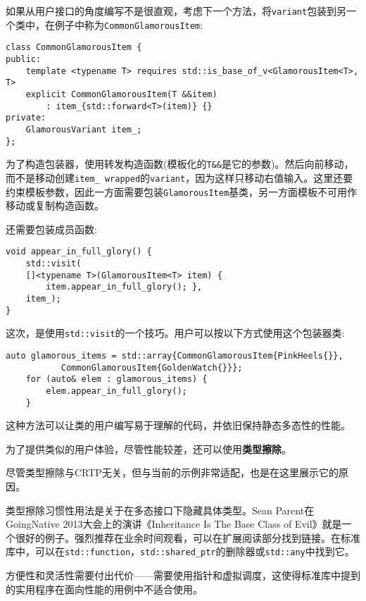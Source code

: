 如果从用户接口的角度编写不是很直观，考虑下一个方法，将\texttt{variant}包装到另一个类中，在例子中称为\texttt{CommonGlamorousItem}:

\begin{lstlisting}[style=styleCXX]
class CommonGlamorousItem {
public:
	template <typename T> requires std::is_base_of_v<GlamorousItem<T>, T>
	explicit CommonGlamorousItem(T &&item)
		: item_{std::forward<T>(item)} {}
private:
	GlamorousVariant item_;
};
\end{lstlisting}

为了构造包装器，使用转发构造函数(模板化的\texttt{T\&\&}是它的参数)。然后向前移动，而不是移动创建\texttt{item\_ wrapped}的\texttt{variant}，因为这样只移动右值输入。这里还要约束模板参数，因此一方面需要包装\texttt{GlamorousItem}基类，另一方面模板不可用作移动或复制构造函数。

还需要包装成员函数:

\begin{lstlisting}[style=styleCXX]
void appear_in_full_glory() {
	std::visit(
	[]<typename T>(GlamorousItem<T> item) {
		item.appear_in_full_glory(); },
	item_);
}
\end{lstlisting}

这次，是使用\texttt{std::visit}的一个技巧。用户可以按以下方式使用这个包装器类:

\begin{lstlisting}[style=styleCXX]
auto glamorous_items = std::array{CommonGlamorousItem{PinkHeels{}},
		   CommonGlamorousItem{GoldenWatch{}}};
	for (auto& elem : glamorous_items) {
		elem.appear_in_full_glory();
	}
\end{lstlisting}

这种方法可以让类的用户编写易于理解的代码，并依旧保持静态多态性的性能。

为了提供类似的用户体验，尽管性能较差，还可以使用\textbf{类型擦除}。


尽管类型擦除与CRTP无关，但与当前的示例非常适配，也是在这里展示它的原因。

类型擦除习惯性用法是关于在多态接口下隐藏具体类型。Sean Parent在GoingNative 2013大会上的演讲《Inheritance Is The Base Class of Evil》就是一个很好的例子。强烈推荐在业余时间观看，可以在扩展阅读部分找到链接。在标准库中，可以在\texttt{std::function}，\texttt{std::shared\_ptr}的删除器或\texttt{std::any}中找到它。

方便性和灵活性需要付出代价——需要使用指针和虚拟调度，这使得标准库中提到的实用程序在面向性能的用例中不适合使用。

